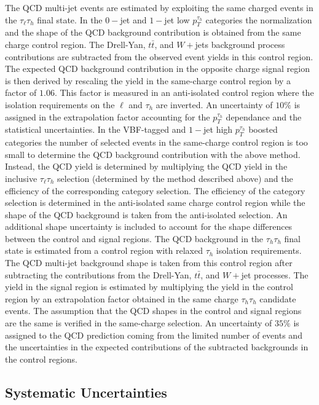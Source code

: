 The QCD multi-jet events are estimated by exploiting the same charged events in the $\tau_{\ell}\tau_h$ final state. In the $0-$jet and $1-$jet low $p_{T}^{\tau_h}$ categories the normalization and the shape  of the QCD background contribution is obtained from the same charge control region. The Drell-Yan, $t\bar{t}$, and $W+$jets background process contributions are subtracted from the observed event yields in this control region. The expected QCD background contribution in the opposite charge signal region is then derived by rescaling the yield in the same-charge control region by a factor of $1.06$. This factor is measured in an anti-isolated control region where the isolation requirements on the $\ell$ and $\tau_h$ are inverted. An uncertainty of $10\%$ is assigned in the extrapolation factor accounting for the $p_{T}^{\tau_h}$ dependance and the statistical uncertainties. In the VBF-tagged and $1-$jet high $p_{T}^{\tau_h}$ boosted categories the number of selected events in the same-charge control region is too small to determine the QCD background contribution with the above method. Instead, the QCD yield is determined by multiplying the QCD yield in the inclusive $\tau_{\ell}\tau_h$ selection (determined by the method described above) and the efficiency of the corresponding category selection. The efficiency of the category selection is determined in the anti-isolated same charge control region while  the shape of the QCD background is taken from the anti-isolated selection. An additional shape uncertainty is included to account for the shape differences between the control and signal regions. The QCD background in the $\tau_h\tau_h$ final state is estimated from a control region with relaxed $\tau_h$ isolation requirements. The QCD multi-jet background shape is taken from this control region after subtracting the contributions from the Drell-Yan, $t\bar{t}$, and $W+$jet processes. The yield in the signal region is estimated by multiplying the yield in the control region by an extrapolation factor obtained in the same charge $\tau_h\tau_h$ candidate events. The assumption that the QCD shapes in the control and signal regions are the same is verified in the same-charge selection.  An uncertainty of $35\%$ is assigned to the QCD prediction coming from the limited number of events and the uncertainties in the expected contributions of the subtracted backgrounds in the control regions.   

\subsection{Systematic Uncertainties}

